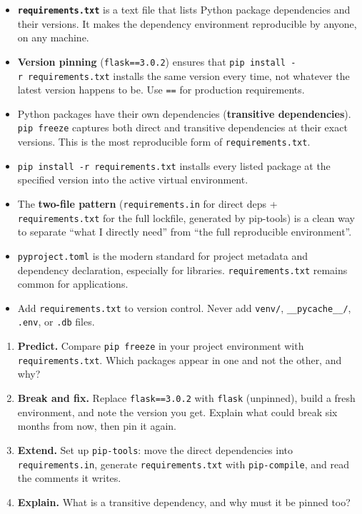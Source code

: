 \label{12-dependency-declaration:key-takeaways}
\begin{takeaways}

\begin{itemize}
\tightlist
\item
  \textbf{\texttt{requirements.txt}} is a text file that lists Python package dependencies and their versions. It makes the dependency environment reproducible by anyone, on any machine.
\item
  \textbf{Version pinning} (\texttt{flask==3.0.2}) ensures that \texttt{pip\ install\ -}\allowbreak{}\texttt{r\ requirements.}\allowbreak{}\texttt{txt} installs the same version every time, not whatever the latest version happens to be. Use \texttt{==} for production requirements.
\item
  Python packages have their own dependencies (\textbf{transitive dependencies}). \texttt{pip\ freeze} captures both direct and transitive dependencies at their exact versions. This is the most reproducible form of \texttt{requirements.txt}.
\item
  \texttt{pip\ install\ -}\allowbreak{}\texttt{r\ requirements.}\allowbreak{}\texttt{txt} installs every listed package at the specified version into the active virtual environment.
\item
  The \textbf{two-file pattern} (\texttt{requirements.in} for direct deps + \texttt{requirements.txt} for the full lockfile, generated by pip-tools) is a clean way to separate ``what I directly need'' from ``the full reproducible environment''.
\item
  \texttt{pyproject.toml} is the modern standard for project metadata and dependency declaration, especially for libraries. \texttt{requirements.txt} remains common for applications.
\item
  Add \texttt{requirements.txt} to version control. Never add \texttt{venv/}, \texttt{\_\_pycache\_\_/}, \texttt{.env}, or \texttt{.db} files.
\end{itemize}

\end{takeaways}

\label{12-dependency-declaration:exercises}

\begin{enumerate}
\def\labelenumi{\arabic{enumi}.}
\tightlist
\item
  \textbf{Predict.} Compare \texttt{pip\ freeze} in your project environment with \texttt{requirements.txt}. Which packages appear in one and not the other, and why?
\item
  \textbf{Break and fix.} Replace \texttt{flask==3.0.2} with \texttt{flask} (unpinned), build a fresh environment, and note the version you get. Explain what could break six months from now, then pin it again.
\item
  \textbf{Extend.} Set up \texttt{pip-tools}: move the direct dependencies into \texttt{requirements.in}, generate \texttt{requirements.txt} with \texttt{pip-compile}, and read the comments it writes.
\item
  \textbf{Explain.} What is a transitive dependency, and why must it be pinned too?
\end{enumerate}

